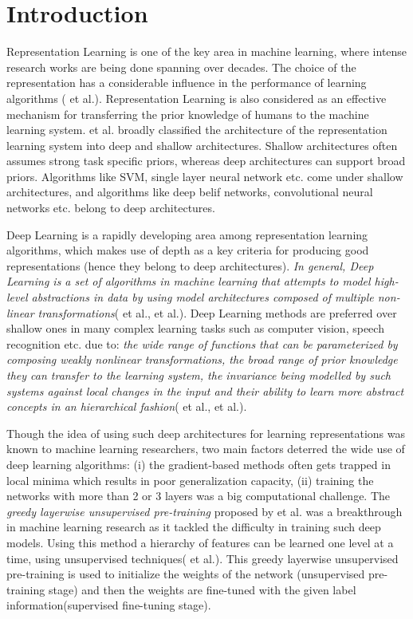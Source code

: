 \chapter{Introduction}
\label{chap_intro}
Representation Learning is one of the key area in machine learning, where intense research works are being done spanning over decades. The choice of the representation has a considerable influence in the performance of learning algorithms (\cite{bengioRL} et al.). Representation Learning is also considered as an effective mechanism for transferring the prior knowledge of humans to the machine learning system. \cite{bengioAI} et al. broadly classified the architecture of the representation learning system  into deep and shallow architectures. Shallow architectures often assumes strong task specific priors, whereas deep architectures can support broad priors. Algorithms like SVM, single layer neural network etc. come under shallow architectures, and algorithms like deep belif networks, convolutional neural networks etc. belong to deep architectures.

Deep Learning is a rapidly developing area among representation learning algorithms, which makes use of depth as a key criteria for producing good representations (hence they belong to deep architectures). \textit{In general, Deep Learning is a set of algorithms in machine learning that attempts to model high-level abstractions in data by using model architectures composed of multiple non-linear transformations}(\cite{bengioLDA} et al., \cite{bengioRL} et al.). Deep Learning methods are preferred over shallow ones in many complex learning tasks such as computer vision, speech recognition etc. due to: \textit{the wide range of functions that can be parameterized by composing weakly nonlinear transformations, the broad range of prior knowledge they can transfer to the learning system, the invariance being modelled by such systems against local changes in the input and their ability to learn more abstract concepts in an hierarchical fashion}(\cite{saul} et al., \cite{bengioAI} et al.).

Though the idea of using such deep architectures for learning representations was known to machine learning researchers, two main factors deterred the wide use of deep learning algorithms: (i) the gradient-based methods often gets trapped in local minima which results in poor generalization capacity, (ii) training the networks with more than 2 or 3 layers was a big computational challenge. The \textit{greedy layerwise unsupervised pre-training} proposed by \cite{hintonDBN} et al. was a breakthrough in machine learning research as it tackled the difficulty in training such deep models. Using this method  a hierarchy of features can be learned one level at a time, using  unsupervised  techniques(\cite{bengioRL} et al.). This greedy layerwise unsupervised pre-training is used to initialize the weights of the network (unsupervised pre-training stage) and then the weights are fine-tuned with the given label information(supervised fine-tuning stage).

